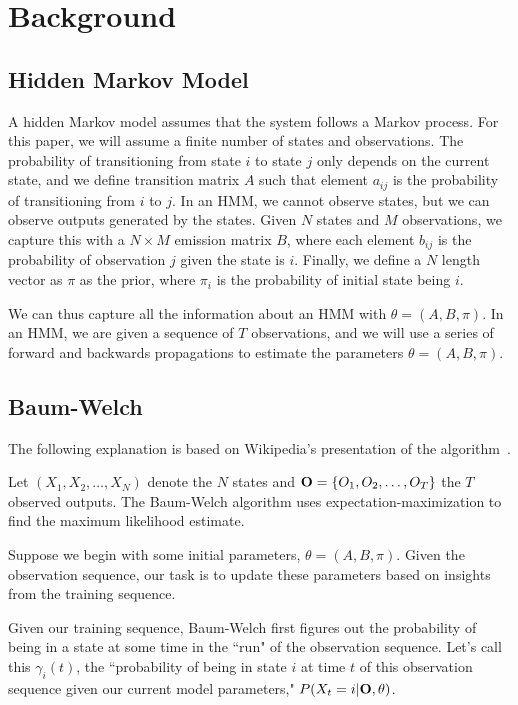 \section{Background}

\subsection{Hidden Markov Model}
A hidden Markov model assumes that the system follows a Markov process. For this
paper, we will assume a finite number of states and observations. The
probability of transitioning from state $i$ to state $j$ only depends on the
current state, and we define transition matrix $A$ such that element $a_{ij}$ is
the probability  of transitioning from $i$ to $j$. In an HMM, we cannot observe
states, but we can observe outputs generated by the states. Given $N$ states and
$M$ observations, we capture this with a $N \times M$ emission matrix $B$, where
each element $b_{ij}$ is the probability of observation $j$ given the state is $i$. Finally, we define a $N$ length vector as $\pi$ as the prior, where $\pi_i$ is the probability of initial state being $i$. 

We can thus capture all the information about an HMM with $\theta = (A, B, \pi)$. In an HMM, we are given a sequence of $T$ observations, and we will use a series of forward and backwards propagations to estimate the parameters $\theta = (A, B, \pi)$.

\subsection{Baum-Welch}

The following explanation is based on Wikipedia's presentation of the
algorithm~\cite{bwwiki}.

Let $(X_1, X_2, \ldots, X_N)$ denote the $N$ states and $\bold{O} = \{O_1, O_2, \ldots, O_T\}$ the $T$ observed outputs. The Baum-Welch algorithm uses expectation-maximization to find the maximum likelihood estimate.

Suppose we begin with some initial parameters, $\theta  =  (A, B, \pi)$.  Given the observation sequence, our task is to update these parameters based on insights from the training sequence.  

Given our training sequence, Baum-Welch first figures out the probability of being in a state at some time in the ``run" of the observation sequence.  Let's call this $\gamma_{i}(t)$, the ``probability of being in state $i$ at time $t$ of this observation sequence given our current model parameters," $P(X_t = i | \bold{O}, \theta)$.

